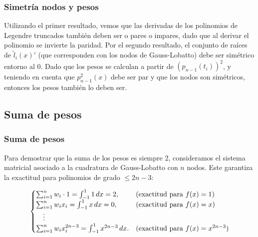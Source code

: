 \documentclass{beamer}
\begin{document}

\begin{frame}
\frametitle{Simetría nodos y pesos}
Utilizando el primer resultado, vemos que las derivadas de los polinomios de Legendre truncados también deben ser o pares o impares, dado que al derivar el polinomio se invierte la paridad. Por el segundo resultado, el conjunto de raíces de $\tilde l_i(x)'$ (que corresponden con los nodos de Gauss-Lobatto) debe ser simétrico entorno al 0. Dado que los pesos se calculan a partir de $(p_{n-1}(t_i))^2$, y teniendo en cuenta que $p_{n-1}^2(x)$ debe ser par y que los nodos son simétricos, entonces los pesos también lo deben ser. 
\end{frame}
\subsection{Suma de pesos}
\begin{frame}
\frametitle{Suma de pesos}
Para demostrar que la suma de los pesos es siempre 2, consideramos el sistema matricial asociado a la cuadratura de Gauss-Lobatto con \( n \) nodos. Este garantiza la exactitud para polinomios de grado \( \leq 2n-3 \):

\[
\begin{cases}
    \sum_{i=1}^n w_i \cdot 1 = \int_{-1}^1 1 \, dx = 2, & \text{(exactitud para \( f(x) = 1 \))} \\
    \sum_{i=1}^n w_i x_i = \int_{-1}^1 x \, dx = 0, & \text{(exactitud para \( f(x) = x \))} \\
    \quad \vdots & \\
    \sum_{i=1}^n w_i x_i^{2n-3} = \int_{-1}^1 x^{2n-3} \, dx. & \text{(exactitud para \( f(x) = x^{2n-3} \))}
\end{cases}
\]
\end{frame}
\end{document}
